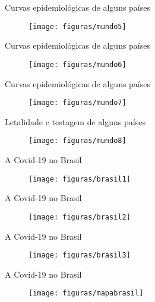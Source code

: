 \documentclass[xcolor=table,t]{beamer}
\begin{document}
\begin{frame}[c]{Curvas epidemiológicas de alguns países}
\begin{figure}
	\centering
	\texttt{[image: figuras/mundo5]}
\end{figure}
\end{frame}

\begin{frame}[c]{Curvas epidemiológicas de alguns países}
\begin{figure}
	\centering
	\texttt{[image: figuras/mundo6]}
\end{figure}
\end{frame}

\begin{frame}[c]{Curvas epidemiológicas de alguns países}
\begin{figure}
	\centering
	\texttt{[image: figuras/mundo7]}
\end{figure}
\end{frame}

\begin{frame}[c]{Letalidade e testagem de alguns países}
\begin{figure}
	\centering
	\texttt{[image: figuras/mundo8]}
\end{figure}
\end{frame}

\begin{frame}[c]{A Covid-19 no Brasil}
\begin{figure}
	\centering
	\texttt{[image: figuras/brasil1]}
\end{figure}
\end{frame}

\begin{frame}[c]{A Covid-19 no Brasil}
\begin{figure}
	\centering
	\texttt{[image: figuras/brasil2]}
\end{figure}
\end{frame}

\begin{frame}[c]{A Covid-19 no Brasil}
\begin{figure}
	\centering
	\texttt{[image: figuras/brasil3]}
\end{figure}
\end{frame}

\begin{frame}[c]{A Covid-19 no Brasil}
\begin{figure}
	\centering
	\texttt{[image: figuras/mapabrasil]}
\end{figure}
\end{frame}
\end{document}
